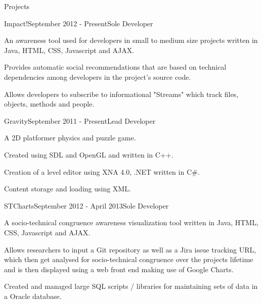 \documentclass{resume} %
\begin{document}

\begin{rSection}{Projects}

\begin{rSubsection}{Impact!}{September 2012 - Present}{Sole Developer}{}
\item An awareness tool used for developers in small to medium size projects written in Java, HTML, CSS, Javascript and AJAX.
\item Provides automatic social recommendations that are based on technical dependencies among developers in the project's source code.
\item Allows developers to subscribe to informational "Streams" which track files, objects, methods and people.
\end{rSubsection}

\begin{rSubsection}{Gravity}{September 2011 - Present}{Lead Developer}{}
\item A 2D platformer physics and puzzle game.
\item Created using SDL and OpenGL and written in C++. 
\item Creation of a level editor using XNA 4.0, .NET written in C\#.
\item Content storage and loading using XML.
\end{rSubsection}

\begin{rSubsection}{STCharts}{September 2012 - April 2013}{Sole Developer}{}
\item A socio-technical congruence awareness visualization tool written in Java, HTML, CSS, Javascript and AJAX.
\item Allows researchers to input a Git repository as well as a Jira issue tracking URL, which then get analysed for socio-technical congruence over the projects lifetime and is then
displayed using a web front end making use of Google Charts.
\item Created and managed large SQL scripts / libraries for maintaining sets of data in a Oracle database.
\end{rSubsection}

\end{rSection}

\end{document}
